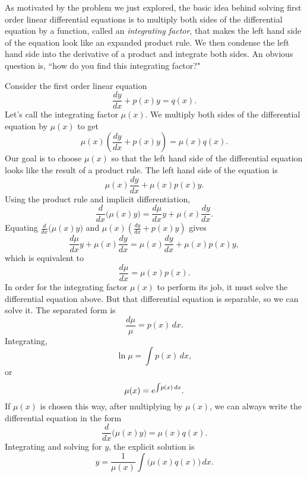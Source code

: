 
As motivated by the problem we just explored, the basic idea behind solving first order linear differential equations is to multiply both sides of the differential equation by a function, called an \emph{integrating factor}, that makes the left hand side of the equation look like an expanded product rule.  We then condense the left hand side into the derivative of a product and integrate both sides. An obvious question is, ``how do you find this integrating factor?"

Consider the first order linear equation
	\[
		\frac{dy}{dx} + p(x)y = q(x).
	\]
Let's call the integrating factor $\mu(x)$.  We multiply both sides of the differential equation by $\mu(x)$ to get
	\[
		\mu(x) \left ( \frac{dy}{dx} + p(x)y \right ) = \mu(x)q(x).
	\]
Our goal is to choose $\mu(x)$ so that the left hand side of the differential equation looks like the result of a product rule.  The left hand side of the equation is
	\[
		\mu(x) \frac{dy}{dx} + \mu(x)p(x)y.
	\]
Using the product rule and implicit differentiation,
	\[
		\frac{d}{dx} \big ( \mu(x) y \big ) = \frac{d\mu}{dx}y + \mu(x)\frac{dy}{dx}.
	\]
Equating $\frac{d}{dx} \big ( \mu(x) y \big )$ and $\mu(x) \left ( \frac{dy}{dx} + p(x)y \right )$ gives
	\[
		\frac{d\mu}{dx}y + \mu(x)\frac{dy}{dx} = \mu(x) \frac{dy}{dx} + \mu(x)p(x)y,
	\]
which is equivalent to
	\[
		\frac{d\mu}{dx} = \mu(x)p(x).	
	\]
In order for the integrating factor $\mu(x)$ to perform its job, it must solve the differential equation above.  But that differential equation is separable, so we can solve it.  The separated form is
	\[
		\frac{d\mu}{\mu} = p(x)\,dx.
	\]
Integrating,
	\[
		\ln \mu = \int p(x)\,dx,
	\]
or
	\[
		\mu(x) = e^{\int \hskip -1.5pt p(x)\,dx}.
	\]
If $\mu(x)$ is chosen this way, after multiplying by $\mu(x)$, we can always write the differential equation in the form
	\[
		\frac{d}{dx} \big( \mu(x)y \big) = \mu(x)q(x).
	\]
Integrating and solving for $y$, the explicit solution is
	\[
		y = \frac{1}{\mu(x)}\int \big( \mu(x)q(x) \big)\,dx.
	\]
	
	
